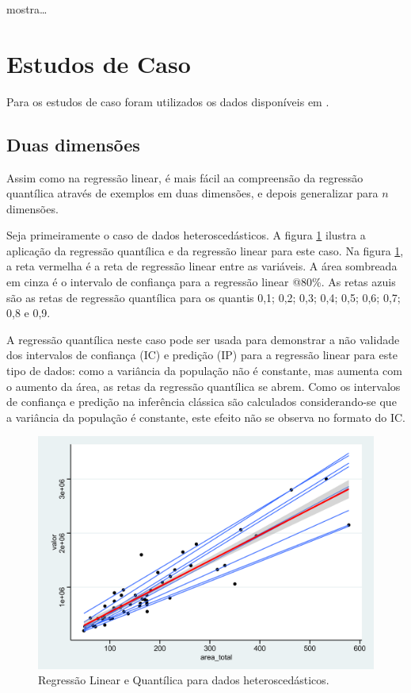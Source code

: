 \documentclass[a4paper, 12pt]{article}
\begin{document}
\textcite{Zietz} mostra\ldots{}

\hypertarget{estudos-de-caso}{%
\section{Estudos de Caso}\label{estudos-de-caso}}

Para os estudos de caso foram utilizados os dados disponíveis em
\textcite{hochheim}.

\hypertarget{duas-dimensoes}{%
\subsection{Duas dimensões}\label{duas-dimensoes}}

Assim como na regressão linear, é mais fácil aa compreensão da regressão
quantílica através de exemplos em duas dimensões, e depois generalizar
para \(n\) dimensões.

Seja primeiramente o caso de dados heteroscedásticos. A figura
\ref{fig:qr1} ilustra a aplicação da regressão quantílica e da regressão
linear para este caso. Na figura \ref{fig:qr1}, a reta vermelha é a reta
de regressão linear entre as variáveis. A área sombreada em cinza é o
intervalo de confiança para a regressão linear @80\%. As retas azuis são
as retas de regressão quantílica para os quantis 0,1; 0,2; 0,3; 0,4;
0,5; 0,6; 0,7; 0,8 e 0,9.

A regressão quantílica neste caso pode ser usada para demonstrar a não
validade dos intervalos de confiança (IC) e predição (IP) para a
regressão linear para este tipo de dados: como a variância da população
não é constante, mas aumenta com o aumento da área, as retas da
regressão quantílica se abrem. Como os intervalos de confiança e
predição na inferência clássica são calculados considerando-se que a
variância da população é constante, este efeito não se observa no
formato do IC.

\begin{figure}[H]

{\centering \includegraphics[width=0.7\linewidth]{images/qr1-1} 

}

\caption{Regressão Linear e Quantílica para dados heteroscedásticos.}\label{fig:qr1}
\end{figure}
\end{document}
